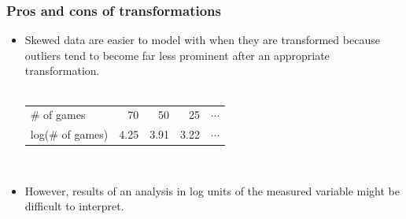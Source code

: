 \documentclass[slidestop,compress,mathserif]{beamer}
\makeatletter
\newcommand{\soln}[1]{\textit{#1}}
\def\chpii@path{../../Chp 2}
\makeatother
\begin{document}
\begin{frame}
\frametitle{Pros and cons of transformations}

\begin{itemize}

\item Skewed data are easier to model with when they are transformed because outliers tend to become far less prominent after an appropriate transformation. \\
$\:$ \\
\renewcommand{\arraystretch}{1.5}
\begin{tabular}{l r r r r }
\# of games		&  70 	& 50 		& 25 		 		& $\cdots$ \\
log(\# of games)	& 4.25	& 3.91 	& 3.22 	 	& $\cdots$
\end{tabular}

$\:$ \\

\item However, results of an analysis in log units of the measured variable might be difficult to interpret.

\end{itemize}

\pause


\soln{}

\end{frame}








\end{document}
